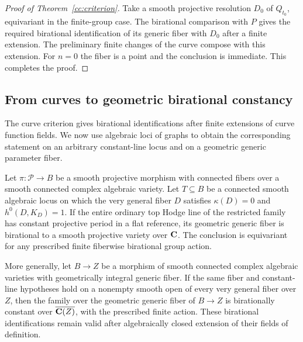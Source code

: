 \begin{proof}[Proof of Theorem~\ref{cc:criterion}]
Take a smooth projective resolution $D_0$ of $Q_{t_0}$, equivariant in
the finite-group case.  The birational comparison with $P$ gives the
required birational identification of its generic fiber with $D_0$
after a finite extension.  The preliminary finite changes of the curve
compose with this extension.  For $n=0$ the fiber is a point and the
conclusion is immediate.  This completes the proof.
\end{proof}

\subsection{From curves to geometric birational constancy}

The curve criterion gives birational identifications after finite
extensions of curve function fields. We now use algebraic loci of
graphs to obtain the corresponding statement on an arbitrary
constant-line locus and on a geometric generic parameter fiber.

\begin{corollary}
\label{cc:loci}
\label{cor:period-loci}
Let $\pi:\mathcal P\to B$ be a smooth projective morphism with
connected fibers over a smooth connected complex algebraic variety.
Let $T\subseteq B$ be a connected smooth algebraic locus on which the
very general fiber $D$ satisfies $\kappa(D)=0$ and $h^0(D,K_D)=1$.
If the entire ordinary top Hodge line of the restricted family has
constant projective period in a flat reference, its geometric generic
fiber is birational to a smooth projective variety over $\mathbf C$.
The conclusion is equivariant for any prescribed finite fiberwise
birational group action.

More generally, let $B\to Z$ be a morphism of smooth connected complex
algebraic varieties with geometrically integral generic fiber.  If the
same fiber and constant-line hypotheses hold on a nonempty smooth
open of every very general fiber over $Z$, then the family over the
geometric generic fiber of $B\to Z$ is birationally constant over
$\overline{\mathbf C(Z)}$, with the prescribed finite action.  These
birational identifications remain valid after algebraically closed
extension of their fields of definition.
\end{corollary}

